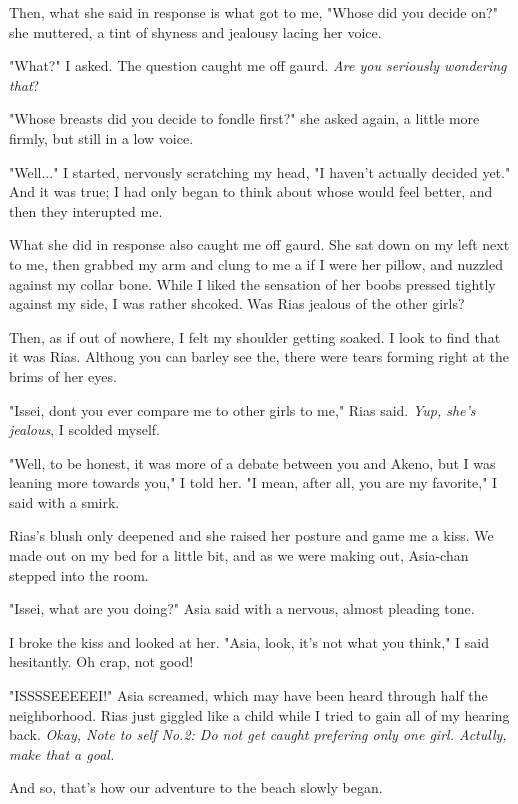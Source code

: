 \documentclass{article}
\begin{document}
Then, what she said in response is what got to me, "Whose did you decide on?" she muttered, a tint of shyness and jealousy lacing her voice.

"What?" I asked. The question caught me off gaurd. \emph{Are you seriously wondering that}?

"Whose breasts did you decide to fondle first?" she asked again, a little more firmly, but still in a low voice.

"Well..." I started, nervously scratching my head, "I haven't actually decided yet." And it was true; I had only began to think about whose would feel better, and then they interupted me.

What she did in response also caught me off gaurd. She sat down on my left next to me, then grabbed my arm and clung to me a if I were her pillow, and nuzzled against my collar bone. While I liked the sensation of her boobs pressed tightly against my side, I was rather shcoked. Was Rias jealous of the other girls?

Then, as if out of nowhere, I felt my shoulder getting soaked. I look to find that it was Rias. Althoug you can barley see the, there were tears forming right at the brims of her eyes.

"Issei, dont you ever compare me to other girls to me," Rias said. \emph{Yup, she's jealous}, I scolded myself.

"Well, to be honest, it was more of a debate between you and Akeno, but I was leaning more towards you," I told her. "I mean, after all, you are my favorite," I said with a smirk.

Rias's blush only deepened and she raised her posture and game me a kiss. We made out on my bed for a little bit, and as we were making out, Asia-chan stepped into the room.

"Issei, what are you doing?" Asia said with a nervous, almost pleading tone.

I broke the kiss and looked at her. "Asia, look, it's not what you think," I said hesitantly. Oh crap, not good!

"ISSSSEEEEEI!" Asia screamed, which may have been heard through half the neighborhood. Rias just giggled like a child while I tried to gain all of my hearing back. \emph{Okay, Note to self No.2: Do not get caught prefering only one girl. Actully, make that a goal.}

And so, that's how our adventure to the beach slowly began.
\end{document}
